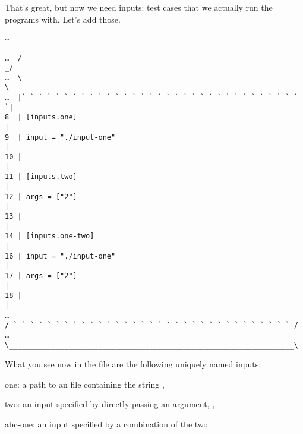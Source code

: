 \documentclass[a4paper,english]{article}
\begin{document}
\begin{adjustwidth}{18pt}{0pt}



%
%

    That's great, but now we need inputs: test cases that we actually run the
    programs with.
    Let's add those.

    \begin{verbatim}
…   ____________________________________________________________________
…  /_ _ _ _ _ _ _ _ _ _ _ _ _ _ _ _ _ _ _ _ _ _ _ _ _ _ _ _ _ _ _ _ _ _/
…  \                                                                   \
…  |` ` ` ` ` ` ` ` ` ` ` ` ` ` ` ` ` ` ` ` ` ` ` ` ` ` ` ` ` ` ` ` ` `|
8  | [inputs.one]                                                      |
9  | input = "./input-one"                                             |
10 |                                                                   |
11 | [inputs.two]                                                      |
12 | args = ["2"]                                                      |
13 |                                                                   |
14 | [inputs.one-two]                                                  |
16 | input = "./input-one"                                             |
17 | args = ["2"]                                                      |
18 |                                                                   |
…  /_`_`_`_`_`_`_`_`_`_`_`_`_`_`_`_`_`_`_`_`_`_`_`_`_`_`_`_`_`_`_`_`_`_/
…  \___________________________________________________________________\
    \end{verbatim}

    What you see now in the file are the following uniquely named inputs:
    \begin{Description}[inputs]\setlength{\itemsep}{0cm}
    \item[one:] a path to an \File{./input-one} file containing the string ,
    \item[two:] an input specified by directly passing an argument, ,
    \item[abc-one:] an input specified by a combination of the two.
    \end{Description}


\end{adjustwidth}
\end{document}
